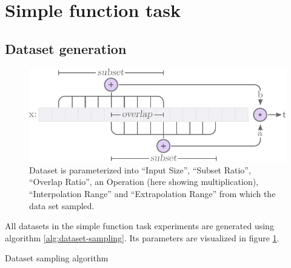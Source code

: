 \section{Simple function task}
\subsection{Dataset generation}
\label{sec:appendix:simple-function-task:data-generation}

\begin{figure}[h]
\centering
\includegraphics[scale=0.8]{graphics/function_task_static_problem.pdf}
\caption{Dataset is parameterized into ``Input Size'', ``Subset Ratio'', ``Overlap Ratio'', an Operation (here showing multiplication), ``Interpolation Range'' and ``Extrapolation Range'' from which the data set sampled.}
\label{fig:simple-function-task-problem}
\end{figure}

All datasets in the simple function task experiments are generated using algorithm \ref{alg:dataset-sampling}. Its parameters are visualized in figure \ref{fig:simple-function-task-problem}.

\begin{algorithm}[h]
  \caption{Dataset sampling algorithm}
  \begin{algorithmic}[1]
       
       
       
       
       
      \State {}
    \EndFunction
  \end{algorithmic}
  \label{alg:dataset-sampling}
\end{algorithm}

